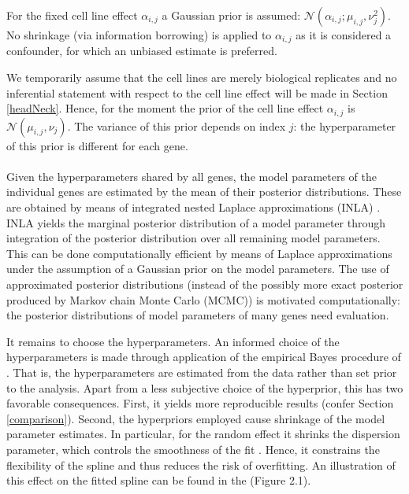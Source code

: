 For the fixed cell line effect $\alpha_{i,j}$ a Gaussian prior is assumed: $\mathcal{N}(\alpha_{i,j};\mu_{i,j},\nu^2_j)$. No shrinkage (via information borrowing) is applied to $\alpha_{i,j}$ as it is considered a confounder, for which an unbiased estimate is preferred.

We temporarily assume that the cell lines are merely biological replicates and no inferential statement with respect to the cell line effect will be made in Section \ref{headNeck}. Hence, for the moment the prior of the cell line effect $\alpha_{i,j}$ is $\mathcal{N}(\mu_{i,j},\nu_j)$. The variance of this prior depends on index $j$: the hyperparameter of this prior is different for each gene.
\\
\\
Given the hyperparameters shared by all genes, the model parameters of the individual genes are estimated by the mean of their posterior distributions. These are obtained by means of integrated nested Laplace approximations (INLA) \cite{Rue2009}. INLA yields the marginal posterior distribution of a model parameter through integration of the posterior distribution over all remaining model parameters. This can be done computationally efficient by means of Laplace approximations under the assumption of a Gaussian prior on the model parameters. The use of approximated posterior distributions (instead of the possibly more exact posterior produced by Markov chain Monte Carlo (MCMC)) is motivated computationally: the posterior distributions of model parameters of many genes need evaluation.

It remains to choose the hyperparameters. An informed choice of the hyperparameters is made through application of the empirical Bayes procedure of \cite{Mark2013}. That is, the hyperparameters are estimated from the data rather than set prior to the analysis. Apart from a less subjective choice of the hyperprior, this has two favorable consequences. First, it yields more reproducible results (confer Section \ref{comparison}). Second, the hyperpriors employed cause shrinkage of the model parameter estimates. In particular, for the random effect it shrinks the dispersion parameter, which controls the smoothness of the fit \cite{Ruppert2009}. Hence, it constrains the flexibility of the spline and thus reduces the risk of overfitting. An illustration of this effect on the fitted spline can be found in the \cite{Supp2018} (Figure 2.1).

